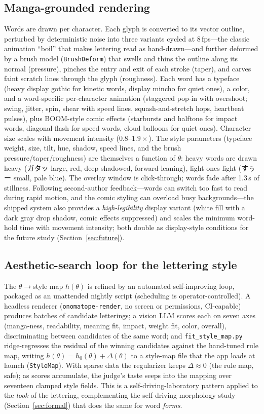 \documentclass[sigconf,nonacm]{acmart}
\newcommand{\jp}[1]{#1}
\begin{document}
\subsection{Manga-grounded rendering}
Words are drawn per character. Each glyph is converted to its vector outline, perturbed by deterministic noise into three variants cycled at 8\,fps---the classic animation ``boil'' that makes lettering read as hand-drawn---and further deformed by a brush model (\texttt{BrushDeform}) that swells and thins the outline along its normal (pressure), pinches the entry and exit of each stroke (taper), and carves faint scratch lines through the glyph (roughness). Each word has a typeface (heavy display gothic for kinetic words, display mincho for quiet ones), a color, and a word-specific per-character animation (staggered pop-in with overshoot; swing, jitter, spin, shear with speed lines, squash-and-stretch hops, heartbeat pulses), plus BOOM-style comic effects (starbursts and halftone for impact words, diagonal flash for speed words, cloud balloons for quiet ones). Character size scales with movement intensity ($0.8$--$1.9\times$). The style parameters (typeface weight, size, tilt, hue, shadow, speed lines, and the brush pressure/taper/roughness) are themselves a function of $\theta$: heavy words are drawn heavy (\jp{ガタッ} large, red, deep-shadowed, forward-leaning), light ones light (\jp{すぅー} small, pale blue). The overlay window is click-through; words fade after 1.3\,s of stillness. Following second-author feedback---words can switch too fast to read during rapid motion, and the comic styling can overload busy backgrounds---the shipped system also provides a \emph{high-legibility} display variant (white fill with a dark gray drop shadow, comic effects suppressed) and scales the minimum word-hold time with movement intensity; both double as display-style conditions for the future study (Section~\ref{sec:future}).

\subsection{Aesthetic-search loop for the lettering style}
\label{sec:aesthetic}
The $\theta\to$style map $h(\theta)$ is refined by an automated self-improving loop, packaged as an unattended nightly script (scheduling is operator-controlled). A headless renderer (\texttt{onomatope-render}, no screen or permissions, CI-capable) produces batches of candidate letterings; a vision LLM scores each on seven axes (manga-ness, readability, meaning fit, impact, weight fit, color, overall), discriminating between candidates of the same word; and \texttt{fit\_style\_map.py} ridge-regresses the residual of the winning candidates against the hand-tuned rule map, writing $h(\theta)=h_0(\theta)+\Delta(\theta)$ to a style-map file that the app loads at launch (\texttt{StyleMap}). With sparse data the regularizer keeps $\Delta\approx0$ (the rule map, safe); as scores accumulate, the judge's taste seeps into the mapping over seventeen clamped style fields. This is a self-driving-laboratory pattern applied to the \emph{look} of the lettering, complementing the self-driving morphology study (Section~\ref{sec:formal}) that does the same for word \emph{forms}.
\end{document}
